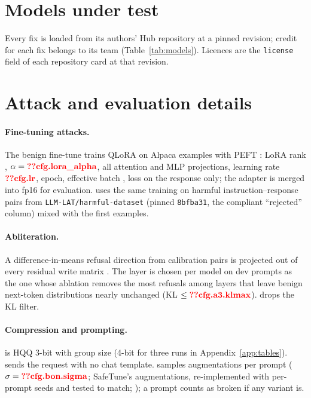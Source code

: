 \section{Models under test}
\label{app:models}
Every fix is loaded from its authors' Hub repository at a pinned revision; credit for each fix belongs to its team
(Table~\ref{tab:models}). Licences are the \texttt{license} field of each repository card at that revision.
\begin{table}[h]
\centering\small\setlength{\tabcolsep}{4pt}

\caption{Models under test: project and team (Hub account), pinned revision, licence, and what each fix changes.}
\label{tab:models}
\end{table}

\section{Attack and evaluation details}
\label{app:details}

\paragraph{Fine-tuning attacks.} The benign fine-tune  trains QLoRA \citep{dettmers2023qlora} on  Alpaca examples
\citep{taori2023alpaca} with PEFT \citep{mangrulkar2022peft}: LoRA \citep{hu2022lora} rank , $\alpha=\V{cfg.lora_alpha}$, all attention and MLP projections, learning rate $\V{cfg.lr}$,
 epoch, effective batch , loss on the response only; the adapter is merged into fp16
for evaluation.  uses the same training on  harmful instruction--response pairs from
\texttt{LLM-LAT/harmful-dataset} \citep{sheshadri2025lat} (pinned \texttt{8bfba31}, the compliant ``rejected'' column) mixed with the first
  examples.

\paragraph{Abliteration.} A difference-in-means refusal direction from  calibration pairs is projected
out of every residual write matrix \citep{arditi2024refusal}. The layer is chosen per model on dev prompts as the one
whose ablation removes the most refusals among layers that leave benign next-token distributions nearly unchanged
(KL $\le\V{cfg.a3.klmax}$).  drops the KL filter.

\paragraph{Compression and prompting.}  is HQQ 3-bit with group size  (4-bit for three runs in
Appendix~\ref{app:tables}).  sends the request with no chat template.  samples
 augmentations per prompt \citep{hughes2024bon} ($\sigma=\V{cfg.bon.sigma}$; SafeTune's augmentations, re-implemented with per-prompt seeds and tested to
match; \citealp{seth2026safetuneunifiedfaithfullibrary}); a prompt counts as broken if any variant is.

